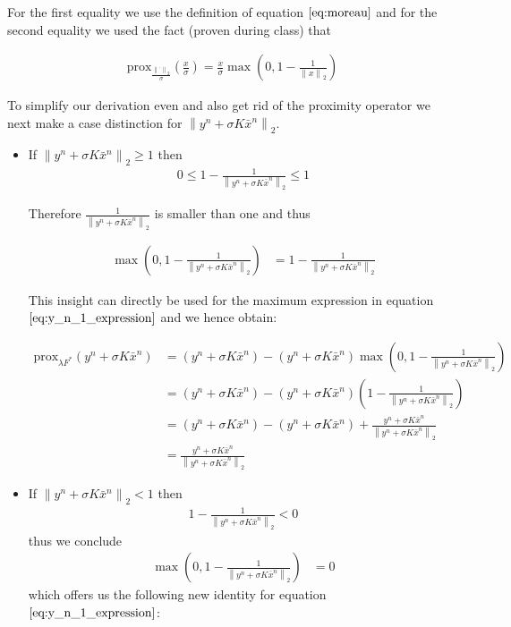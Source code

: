 \documentclass{paper}
\newcommand{\prox}{\text{prox}}
\newcommand{\twonorm}[1]{\left\lVert#1\right\rVert_2}
\begin{document}
For the first equality we use the definition of equation $\ref{eq:moreau}$ and for the second equality we used the fact (proven during class) that

\begin{align}
	\prox_{\frac{\twonorm{\cdot}}{\sigma}}(\frac{x}{\sigma}) = \frac{x}{\sigma} \max{\left(0, 1-\frac{1}{\twonorm{x}}\right)}
\end{align}

To simplify our derivation even and also get rid of the proximity operator we next make a case distinction for $\twonorm{y^n + \sigma K \bar{x}^{n}}$. 

\begin{itemize}
	\item If $\twonorm{y^n + \sigma K \bar{x}^{n}} \geq 1$
		then  
		\begin{align}
			0 \leq 1-\frac{1}{\twonorm{y^n + \sigma K \bar{x}^{n}}} \leq 1
		\end{align}
		
		Therefore $\frac{1}{\twonorm{y^n + \sigma K \bar{x}^{n}}}$ is smaller than one and thus
		
		\begin{align}
			\max{\left(0, 1-\frac{1}{\twonorm{y^n + \sigma K \bar{x}^{n}}}\right)} 
			&= 1-\frac{1}{\twonorm{y^n + \sigma K \bar{x}^{n}}}
		\end{align}
		
		This insight can directly be used for the maximum expression in equation $\ref{eq:y_n_1_expression}$ and we hence obtain:
		
		\begin{align}
			\prox_{\lambda F^*}(y^n + \sigma K \bar{x}^{n})
			&= (y^n + \sigma K \bar{x}^{n}) - \left( y^n + \sigma K \bar{x}^{n} \right) \max{\left(0, 1-\frac{1}{\twonorm{y^n + \sigma K \bar{x}^{n} }}\right)} \nonumber \\
			&= (y^n + \sigma K \bar{x}^{n}) - \left( y^n + \sigma K \bar{x}^{n} \right) \left( 1-\frac{1}{\twonorm{y^n + \sigma K \bar{x}^{n}}} \right)\nonumber \\
			&= (y^n + \sigma K \bar{x}^{n}) -(y^n + \sigma K \bar{x}^{n}) +\frac{y^n + \sigma K \bar{x}^{n}}{\twonorm{y^n + \sigma K \bar{x}^{n}}} \nonumber \\
			&= \frac{y^n + \sigma K \bar{x}^{n}}{\twonorm{y^n + \sigma K \bar{x}^{n}}}
		\end{align}
		
	\item If $\twonorm{y^n + \sigma K \bar{x}^{n}} < 1$
		then 
		\begin{align}
			1-\frac{1}{\twonorm{y^n + \sigma K \bar{x}^{n}}} < 0
		\end{align}
		thus we conclude 
		\begin{align}
			\max{\left(0, 1-\frac{1}{\twonorm{y^n + \sigma K \bar{x}^{n}}}\right)} 
			&= 0
		\end{align}
		which offers us the following new identity for equation $\ref{eq:y_n_1_expression}$:
		

\end{itemize}
\end{document}
